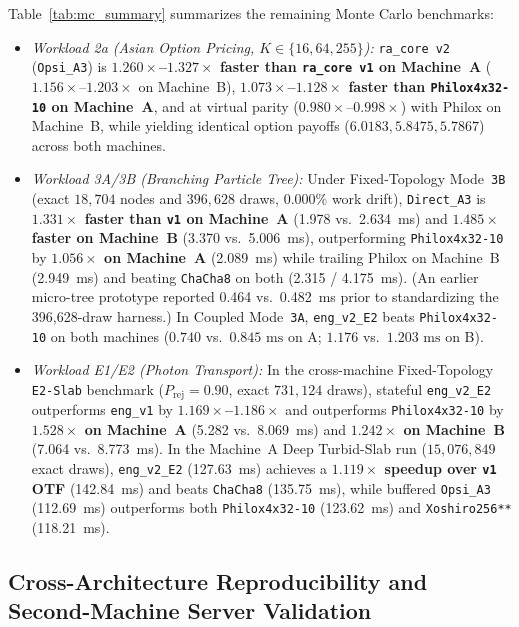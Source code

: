 \documentclass[conference]{IEEEtran}
\begin{document}
Table~\ref{tab:mc_summary} summarizes the remaining Monte Carlo benchmarks:
\begin{itemize}
    \item \emph{Workload 2a (Asian Option Pricing, $K \in \{16, 64, 255\}$):} \texttt{ra\_core v2} (\texttt{Opsi\_A3}) is \textbf{$1.260\times$--$1.327\times$ faster than \texttt{ra\_core v1} on Machine~A} ($1.156\times$--$1.203\times$ on Machine~B), \textbf{$1.073\times$--$1.128\times$ faster than \texttt{Philox4x32-10} on Machine~A}, and at virtual parity ($0.980\times$--$0.998\times$) with Philox on Machine~B, while yielding identical option payoffs ($6.0183, 5.8475, 5.7867$) across both machines.
    \item \emph{Workload 3A/3B (Branching Particle Tree):} Under Fixed-Topology Mode~\texttt{3B} (exact $18{,}704$ nodes and $396{,}628$ draws, $0.000\%$ work drift), \texttt{Direct\_A3} is \textbf{$1.331\times$ faster than \texttt{v1} on Machine~A} (1.978 vs.\ 2.634~ms) and \textbf{$1.485\times$ faster on Machine~B} (3.370 vs.\ 5.006~ms), outperforming \texttt{Philox4x32-10} by \textbf{$1.056\times$ on Machine~A} (2.089~ms) while trailing Philox on Machine~B (2.949~ms) and beating \texttt{ChaCha8} on both (2.315 / 4.175~ms). (An earlier micro-tree prototype reported 0.464 vs.\ 0.482~ms prior to standardizing the 396,628-draw harness.) In Coupled Mode~\texttt{3A}, \texttt{eng\_v2\_E2} beats \texttt{Philox4x32-10} on both machines ($0.740$ vs.\ $0.845\text{ ms}$ on A; $1.176$ vs.\ $1.203\text{ ms}$ on B).
    \item \emph{Workload E1/E2 (Photon Transport):} In the cross-machine Fixed-Topology \texttt{E2-Slab} benchmark ($P_{\text{rej}}=0.90$, exact $731{,}124$ draws), stateful \texttt{eng\_v2\_E2} outperforms \texttt{eng\_v1} by \textbf{$1.169\times$--$1.186\times$} and outperforms \texttt{Philox4x32-10} by \textbf{$1.528\times$ on Machine~A} (5.282 vs.\ 8.069~ms) and \textbf{$1.242\times$ on Machine~B} (7.064 vs.\ 8.773~ms). In the Machine~A Deep Turbid-Slab run ($15{,}076{,}849$ exact draws), \texttt{eng\_v2\_E2} (127.63~ms) achieves a \textbf{$1.119\times$ speedup over \texttt{v1} OTF} (142.84~ms) and beats \texttt{ChaCha8} (135.75~ms), while buffered \texttt{Opsi\_A3} (112.69~ms) outperforms both \texttt{Philox4x32-10} (123.62~ms) and \texttt{Xoshiro256**} (118.21~ms).
\end{itemize}

\subsection{Cross-Architecture Reproducibility and Second-Machine Server Validation}\label{sec:cross_arch}
\end{document}
